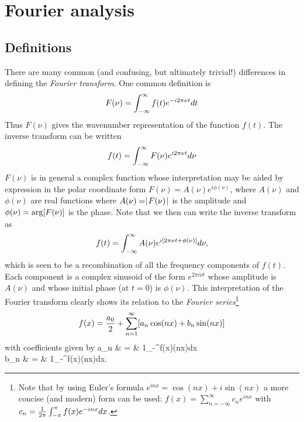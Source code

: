%
\chapter{Fourier analysis}

\section{Definitions}

There are many common (and confusing, but ultimately trivial!)
differences in defining the {\it Fourier transform}. One common 
definition is 
\[
F(\nu)=\int_{-\infty}^{\infty} f(t)e^{-i2\pi\nu t}dt
\]
Thus $F(\nu)$ gives the wavenumber representation of the function
$f(t)$. The inverse transform can be written 
\[
f(t)=\int_{-\infty}^{\infty} F(\nu)e^{i2\pi\nu t}d\nu
\]
$F(\nu)$ is in general a complex function whose interpretation may be
aided by expression in the polar coordinate form
$F(\nu)=A(\nu)e^{i\phi(\nu)}$, where $A(\nu)$ and $\phi(\nu)$ are real
functions where $A(\nu)=\mid\!{F(\nu)}\!\mid$ is the amplitude and $\phi(\nu)={\rm
  arg}[F(\nu)]$  is the phase. Note that we then can write the inverse 
transform as 
\[
f(t)=\int_{-\infty}^{\infty} A(\nu)e^{i[2\pi\nu t+\phi(\nu)]}d\nu,
\]
which is seen to be a recombination of all the frequency components of
$f(t)$. Each component is a complex sinusoid of the form $e^{2\pi i\nu t}$
whose amplitude is $A(\nu)$ and whose initial phase (at $t=0$) is
$\phi(\nu)$. This interpretation of the Fourier transform clearly
shows its relation to the {\it Fourier series}\footnote{Note that by 
using Euler's formula $e^{inx}=\cos(nx)+i\sin(nx)$ a more concise (and
modern) form can be used: $f(x)=\sum_{n=-\infty}^\infty c_n e^{inx}$
with $c_n={1\over 2\pi}\int_{-\pi}^{\pi} f(x)e^{-inx}dx$.} 
\[
f(x)={a_0\over 2}+\sum_{n=1}^\infty[a_n\cos(nx)+b_n\sin(nx)]
\]
with coefficients given by 
\bua
a_n & = & {1\over\pi}\int_{-\pi}^\pi f(x)\cos(nx)dx \\
b_n & = & {1\over\pi}\int_{-\pi}^\pi f(x)\sin(nx)dx.
\eua

